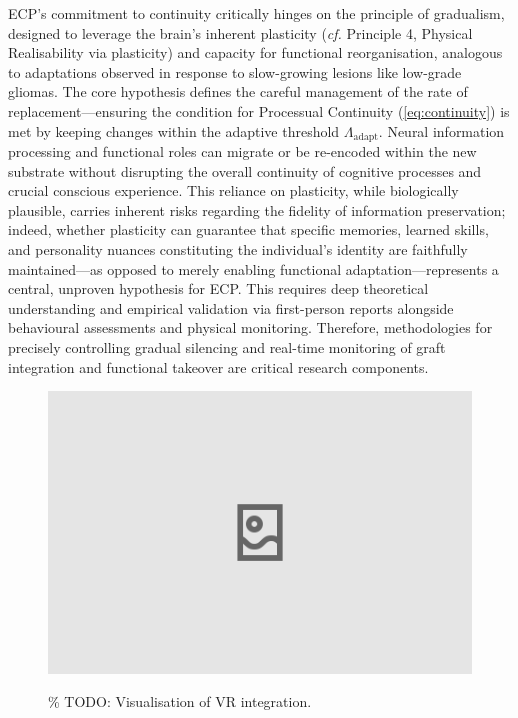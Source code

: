 \documentclass[10pt]{article}
\begin{document}
\begin{sloppypar}
  ECP’s commitment to continuity critically hinges on the principle of gradualism, designed to leverage the brain’s inherent plasticity (\textit{cf.} Principle 4, Physical Realisability via plasticity) and capacity for functional reorganisation, analogous to adaptations observed in response to slow-growing lesions like low-grade gliomas. The core hypothesis defines the careful management of the rate of replacement—ensuring the condition for Processual Continuity (\autoref{eq:continuity}) is met by keeping changes within the adaptive threshold \( \Lambda_{\text{adapt}} \). Neural information processing and functional roles can migrate or be re-encoded within the new substrate without disrupting the overall continuity of cognitive processes and crucial conscious experience. This reliance on plasticity, while biologically plausible, carries inherent risks regarding the fidelity of information preservation; indeed, whether plasticity can guarantee that specific memories, learned skills, and personality nuances constituting the individual’s identity are faithfully maintained—as opposed to merely enabling functional adaptation—represents a central, unproven hypothesis for ECP. This requires deep theoretical understanding and empirical validation via first-person reports alongside behavioural assessments and physical monitoring. Therefore, methodologies for precisely controlling gradual silencing and real-time monitoring of graft integration and functional takeover are critical research components.

  \begin{figure}[ht]
    \centering
    \includegraphics[width=\textwidth]{figures/ecp-vr-integration.png}
    \label{fig:ecp-vr-integration}
    \caption{\% TODO: Visualisation of VR integration.}
  \end{figure}


\end{sloppypar}
\end{document}
